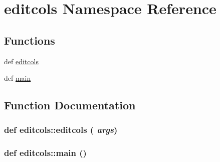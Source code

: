 \hypertarget{namespaceeditcols}{
\section{editcols Namespace Reference}
\label{namespaceeditcols}
}
\subsection*{Functions}
\begin{CompactItemize}
\item 
def \hyperlink{namespaceeditcols_a92bfbedd2a1f59a4741b1bb2b4b1a38}{editcols}
\item 
def \hyperlink{namespaceeditcols_41465a54c2a568b6abad72ffbb139917}{main}
\end{CompactItemize}


\subsection{Function Documentation}
\hypertarget{namespaceeditcols_a92bfbedd2a1f59a4741b1bb2b4b1a38}{
\subsubsection[{editcols}]{\setlength{\rightskip}{0pt plus 5cm}def editcols::editcols ( {\em args})}}
\label{namespaceeditcols_a92bfbedd2a1f59a4741b1bb2b4b1a38}


\hypertarget{namespaceeditcols_41465a54c2a568b6abad72ffbb139917}{
\subsubsection[{main}]{\setlength{\rightskip}{0pt plus 5cm}def editcols::main ()}}
\label{namespaceeditcols_41465a54c2a568b6abad72ffbb139917}


